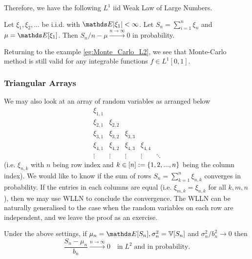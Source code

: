 \begin{unexaminable}
Therefore, we have the following $L^1$ iid Weak Law of Large Numbers.
\begin{theorem} \label{thm:WLLN1}
Let $\xi_1, \xi_2, ...$ be i.i.d. with $\E|\xi_1|<\infty$. Let $S_n = \sum_{i=1}^n \xi_n$ and $\mu = \E[\xi_1]$. Then $S_n/n - \mu \overset{n\to\infty}\to 0$ in probability.
\end{theorem}

\begin{example}
Returning to the example \ref{eg:Monte_Carlo_L2}, we see that Monte-Carlo method is still valid for any integrable functions $f \in L^1[0,1]$.
\end{example}

\subsubsection{Triangular Arrays}
We may also look at an array of random variables as arranged below
\begin{equation*}
\begin{array}{ccccc}
    \xi_{1,1} &  &  &  & \\
    \xi_{2,1} & \xi_{2,2} &  &  & \\
    \xi_{3,1} & \xi_{3,2} & \xi_{3,3} &  & \\
    \xi_{4,1} & \xi_{4,2} & \xi_{4,3} &  \xi_{4,4} & \\
    \vdots & \vdots & \vdots & \vdots & \ddots
\end{array}
\end{equation*}
(i.e. $\xi_{n,k}$ with $n$ being row index and $k \in [n] := \left\{ 1,2,...,n \right \}$ being the column index). We would like to know if the sum of rows $S_n = \sum_{k=1}^n \xi_{n,k}$ converges in probability. If the entries in each columns are equal (i.e. $\xi_{m,k} = \xi_{n,k}$ for all $k,m,n$), then we may use WLLN to conclude the convergence. The WLLN can be naturally generalised to the case when the random variables on each row are independent, and we leave the proof as an exercise.
\begin{exercise} \label{ex:L2_WLLN_Array}
Under the above settings, if $\mu_n = \E[S_n], \sigma^2_n = \V[S_n]$ and $\sigma_n^2/b_n^2 \to 0$ then 
\begin{equation*}
\frac{S_n - \mu_n}{b_n} \overset{n\to\infty}\to 0 \quad \text{in} \; L^2 \; \text{and in probability.}
\end{equation*}
\end{exercise}


\end{unexaminable}
